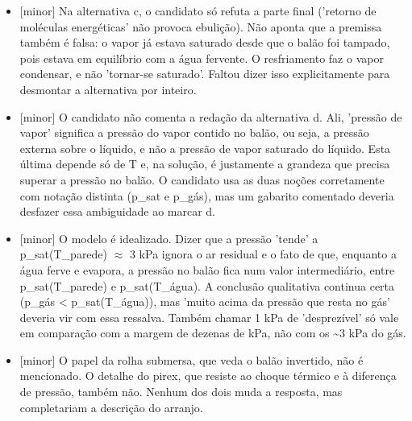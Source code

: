 \documentclass{article}%
\begin{document}
\begin{itemize}%
\item%
{[}minor{]} Na alternativa c, o candidato só refuta a parte final ('retorno de moléculas energéticas' não provoca ebulição). Não aponta que a premissa também é falsa: o vapor já estava saturado desde que o balão foi tampado, pois estava em equilíbrio com a água fervente. O resfriamento faz o vapor condensar, e não 'tornar{-}se saturado'. Faltou dizer isso explicitamente para desmontar a alternativa por inteiro.%
\item%
{[}minor{]} O candidato não comenta a redação da alternativa d. Ali, 'pressão de vapor' significa a pressão do vapor contido no balão, ou seja, a pressão externa sobre o líquido, e não a pressão de vapor saturado do líquido. Esta última depende só de T e, na solução, é justamente a grandeza que precisa superar a pressão no balão. O candidato usa as duas noções corretamente com notação distinta (p\_sat e p\_gás), mas um gabarito comentado deveria desfazer essa ambiguidade ao marcar d.%
\item%
{[}minor{]} O modelo é idealizado. Dizer que a pressão 'tende' a p\_sat(T\_parede) $\approx$ 3 kPa ignora o ar residual e o fato de que, enquanto a água ferve e evapora, a pressão no balão fica num valor intermediário, entre p\_sat(T\_parede) e p\_sat(T\_água). A conclusão qualitativa continua certa (p\_gás < p\_sat(T\_água)), mas 'muito acima da pressão que resta no gás' deveria vir com essa ressalva. Também chamar 1 kPa de 'desprezível' só vale em comparação com a margem de dezenas de kPa, não com os \textasciitilde{}3 kPa do gás.%
\item%
{[}minor{]} O papel da rolha submersa, que veda o balão invertido, não é mencionado. O detalhe do pirex, que resiste ao choque térmico e à diferença de pressão, também não. Nenhum dos dois muda a resposta, mas completariam a descrição do arranjo.%
\end{itemize}%
\end{document}
